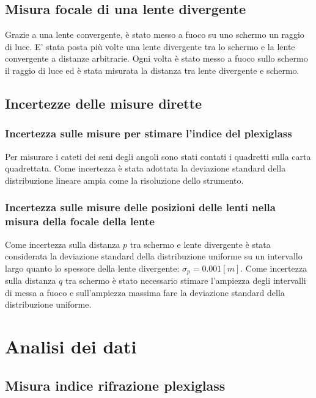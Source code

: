 \documentclass{article}
\begin{document}
\subsection{Misura focale di una lente divergente}

Grazie a una lente convergente, è stato messo a fuoco su uno schermo un raggio di luce. 
E' stata posta più volte una lente divergente tra lo schermo e la lente convergente a distanze arbitrarie. 
Ogni volta è stato messo a fuoco sullo schermo il raggio di luce ed è stata misurata la distanza tra lente divergente e schermo. 

\subsection{Incertezze delle misure dirette}


\subsubsection{Incertezza sulle misure per stimare l'indice del plexiglass}

Per misurare i cateti dei seni degli angoli sono stati contati i quadretti sulla carta quadrettata.
Come incertezza è stata adottata la  deviazione standard della distribuzione lineare ampia come la risoluzione dello strumento.

\subsubsection{Incertezza sulle misure delle posizioni delle lenti nella misura della focale della lente}

Come incertezza sulla distanza $p$ tra schermo e lente divergente è stata considerata la deviazione standard della distribuzione uniforme su un intervallo largo quanto lo spessore della lente divergente: $\sigma_p=0.001[m]$.
 Come incertezza sulla distanza $q$ tra schermo è stato necessario stimare l'ampiezza degli intervalli di messa a fuoco e sull'ampiezza massima fare la deviazione standard della distribuzione uniforme.

\section{Analisi dei dati}
 
\subsection{Misura indice rifrazione plexiglass}
\end{document}
